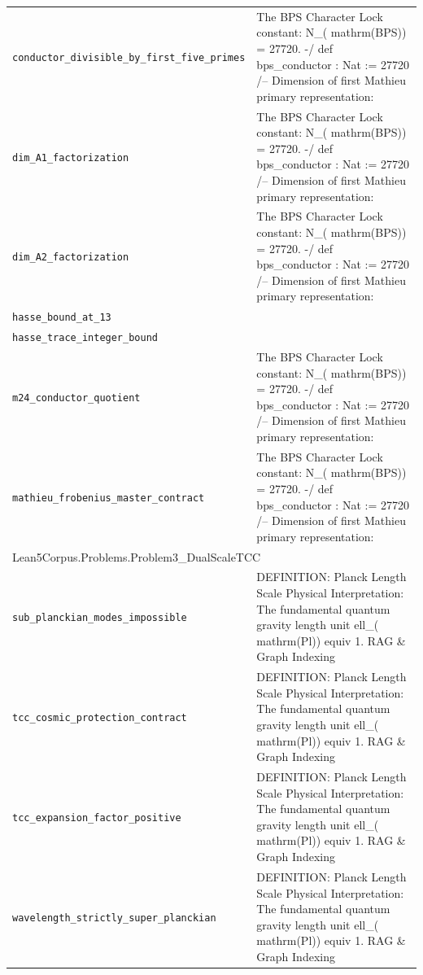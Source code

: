 \begin{longtable}{p{}p{}}
\quad\texttt{\footnotesize conductor\_divisible\_by\_first\_five\_primes} & {\footnotesize The BPS Character Lock constant: N\_( mathrm(BPS)) = 27720. -/ def bps\_conductor : Nat := 27720 /-- Dimension of first Mathieu primary representation: } \\
\quad\texttt{\footnotesize dim\_A1\_factorization} & {\footnotesize The BPS Character Lock constant: N\_( mathrm(BPS)) = 27720. -/ def bps\_conductor : Nat := 27720 /-- Dimension of first Mathieu primary representation: } \\
\quad\texttt{\footnotesize dim\_A2\_factorization} & {\footnotesize The BPS Character Lock constant: N\_( mathrm(BPS)) = 27720. -/ def bps\_conductor : Nat := 27720 /-- Dimension of first Mathieu primary representation: } \\
\quad\texttt{\footnotesize hasse\_bound\_at\_13} & {\footnotesize } \\
\quad\texttt{\footnotesize hasse\_trace\_integer\_bound} & {\footnotesize } \\
\quad\texttt{\footnotesize m24\_conductor\_quotient} & {\footnotesize The BPS Character Lock constant: N\_( mathrm(BPS)) = 27720. -/ def bps\_conductor : Nat := 27720 /-- Dimension of first Mathieu primary representation: } \\
\quad\texttt{\footnotesize mathieu\_frobenius\_master\_contract} & {\footnotesize The BPS Character Lock constant: N\_( mathrm(BPS)) = 27720. -/ def bps\_conductor : Nat := 27720 /-- Dimension of first Mathieu primary representation: } \\
\multicolumn{2}{l}{\textsf{\small Lean5Corpus.Problems.Problem3\_DualScaleTCC}} \\
\quad\texttt{\footnotesize sub\_planckian\_modes\_impossible} & {\footnotesize DEFINITION: Planck Length Scale Physical Interpretation: The fundamental quantum gravity length unit  ell\_( mathrm(Pl))  equiv 1. RAG \& Graph Indexing} \\
\quad\texttt{\footnotesize tcc\_cosmic\_protection\_contract} & {\footnotesize DEFINITION: Planck Length Scale Physical Interpretation: The fundamental quantum gravity length unit  ell\_( mathrm(Pl))  equiv 1. RAG \& Graph Indexing} \\
\quad\texttt{\footnotesize tcc\_expansion\_factor\_positive} & {\footnotesize DEFINITION: Planck Length Scale Physical Interpretation: The fundamental quantum gravity length unit  ell\_( mathrm(Pl))  equiv 1. RAG \& Graph Indexing} \\
\quad\texttt{\footnotesize wavelength\_strictly\_super\_planckian} & {\footnotesize DEFINITION: Planck Length Scale Physical Interpretation: The fundamental quantum gravity length unit  ell\_( mathrm(Pl))  equiv 1. RAG \& Graph Indexing} \\

\end{longtable}

